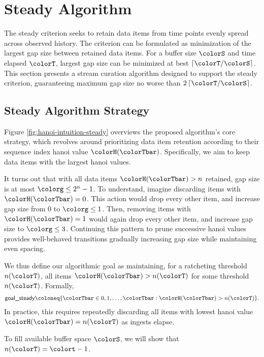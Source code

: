 \section{Steady Algorithm} \label{sec:steady}

The steady criterion seeks to retain data items from time points evenly spread across observed history.
The criterion can be formulated as minimization of the largest gap size between retained data items.
For a buffer size $\colorS$ and time elapsed $\colorT$, largest gap size can be minimized at best $\left\lceil \colorT / \colorS \right\rceil$.
This section presents a stream curation algorithm designed to support the steady criterion, guaranteeing maximum gap size no worse than $2\left\lceil \colorT / \colorS \right\rceil$.

\subsection{Steady Algorithm Strategy}
\label{sec:steady-strategy}

Figure \ref{fig:hanoi-intuition-steady} overviews the proposed algorithm's core strategy, which revolves around prioritizing data item retention according to their sequence index hanoi value $\colorH(\colorTbar)$.
Specifically, we aim to keep data items with the largest hanoi values.

It turns out that with all data items $\colorH(\colorTbar) > n$ retained, gap size is at most $\colorg \leq 2^n - 1$.
To understand, imagine discarding items with $\colorH(\colorTbar) = 0$.
This action would drop every other item, and increase gap size from 0 to $\colorg \leq 1$.
Then, removing items with $\colorH(\colorTbar) = 1$ would again drop every other item, and increase gap size to $\colorg \leq 3$.
Continuing this pattern to prune successive hanoi values provides well-behaved transitions gradually increasing gap size while maintaining even spacing.

We thus define our algorithmic goal as maintaining, for a ratcheting threshold $n(\colorT)$, all items $\colorH(\colorTbar) > n(\colorT)$ for some threshold $n(\colorT)$.
Formally,
\begin{align*}
\textsf{goal\_steady}
\coloneq \{
\colorTbar \in 0, 1, \ldots,\colorTbar
: \colorH(\colorTbar) > n(\colorT)
\}.
\end{align*}
In practice, this requires repeatedly discarding all items with lowest hanoi value $\colorH(\colorTbar) = n(\colorT)$ as ingests elapse.

To fill available buffer space $\colorS$, we will show that $n(\colorT) = \colort - 1$.

